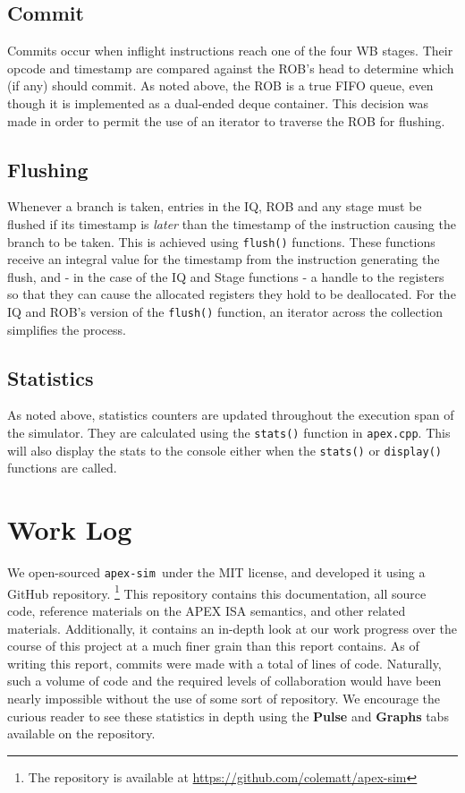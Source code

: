 \documentclass[12pt]{article}
\newcommand{\codename}[0]{\texttt{apex-sim}~}
\begin{document}
\subsection{Commit}
Commits occur when inflight instructions reach one of the four WB stages. 
Their opcode and timestamp are compared against the ROB's head to determine which (if any) should commit. 
As noted above, the ROB is a true FIFO queue, even though it is implemented as a dual-ended deque container.
This decision was made in order to permit the use of an iterator to traverse the ROB for flushing.

\subsection{Flushing}
Whenever a branch is taken, entries in the IQ, ROB and any stage must be flushed if its timestamp is \textit{later} than the timestamp of the instruction causing the branch to be taken. 
This is achieved using \texttt{flush()} functions. 
These functions receive an integral value for the timestamp from the instruction generating the flush, and \-- in the case of the IQ and Stage functions \-- a handle to the registers so that they can cause the allocated registers they hold to be deallocated.
For the IQ and ROB's version of the \texttt{flush()} function, an iterator across the collection simplifies the process.

\subsection{Statistics}
As noted above, statistics counters are updated throughout the execution span of the simulator. They are calculated using the \texttt{stats()} function in \texttt{apex.cpp}. 
This will also display the stats to the console either when the \texttt{stats()} or \texttt{display()} functions are called. 


\section{Work Log}
\label{sec:worklog}
We open-sourced \codename under the MIT license, and developed it using a GitHub repository. \footnote{The repository is available at \url{https://github.com/colematt/apex-sim}}
This repository contains this documentation, all source code, reference materials on the APEX ISA semantics, and other related materials.
Additionally, it contains an in-depth look at our work progress over the course of this project at a much finer grain than this report contains.
As of writing this report,  commits were made with a total of  lines of code.
Naturally, such a volume of code and the required levels of collaboration would have been nearly impossible without the use of some sort of repository.
We encourage the curious reader to see these statistics in depth using the \textbf{Pulse} and \textbf{Graphs} tabs available on the repository.
\end{document}
